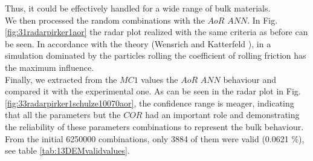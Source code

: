 Thus, it could be effectively handled for a wide range of bulk materials.\\
We then processed the random combinations with the $AoR$ $ANN$. In Fig.
\ref{fig:31radarpirker1aor} the radar plot realized with the same criteria as
before can be seen.
In accordance with the theory (Wensrich and Katterfeld \cite{RefWorks:87}), in a simulation dominated
by the particles rolling the coefficient of rolling friction has the maximum
influence. \\
Finally, we extracted from the $MC1$ values the $AoR$ $ANN$ behaviour
and compared it with the experimental one.
As can be seen in the radar plot in Fig.
\ref{fig:33radarpirker1schulze10070aor}, the confidence range is meager, indicating that all the parameters but the $COR$ 
had an important role and demonstrating the reliability of these parameters
combinations to represent the bulk behaviour.
From the initial 6250000 combinations, only 3884 of them were valid (0.0621 \%),
see table \ref{tab:13DEMvalidvalues}.










